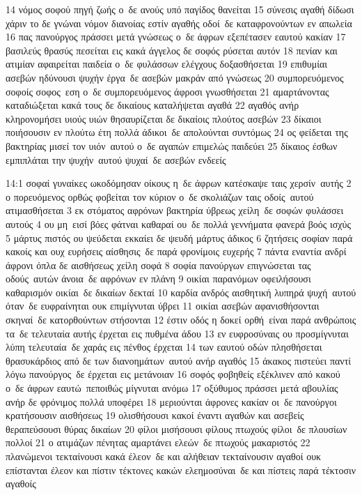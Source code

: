 \documentclass[10pt,oneside,footinclude=true,headinclude=true]{scrbook} %
\begin{document}
14 νόμος σοφού πηγή ζωής ο δε ανούς υπό παγίδος θανείται
15 σύνεσις αγαθή δίδωσι χάριν το δε γνώναι νόμον διανοίας εστίν αγαθής οδοί δε καταφρονούντων εν απωλεία
16 πας πανούργος πράσσει μετά γνώσεως ο δε άφρων εξεπέτασεν εαυτού κακίαν
17 βασιλεύς θρασύς πεσείται εις κακά άγγελος δε σοφός ρύσεται αυτόν
18 πενίαν και ατιμίαν αφαιρείται παιδεία ο δε φυλάσσων ελέγχους δοξασθήσεται
19 επιθυμίαι ασεβών ηδύνουσι ψυχήν έργα δε ασεβών μακράν από γνώσεως
20 συμπορευόμενος σοφοίς σοφος εση ο δε συμπορευόμενος άφροσι γνωσθήσεται
21 αμαρτάνοντας καταδιώξεται κακά τους δε δικαίους καταλήψεται αγαθά
22 αγαθός ανήρ κληρονομήσει υιούς υιών θησαυρίζεται δε δικαίοις πλούτος ασεβών
23 δίκαιοι ποιήσουσιν εν πλούτω έτη πολλά άδικοι δε απολούνται συντόμως
24 ος φείδεται της βακτηρίας μισεί τον υιόν αυτού ο δε αγαπών επιμελώς παιδεύει
25 δίκαιος έσθων εμπιπλάται την ψυχήν αυτού ψυχαί δε ασεβών ενδεείς
\par
14:1 σοφαί γυναίκες ωκοδόμησαν οίκους η δε άφρων κατέσκαψε ταις χερσίν αυτής
2 ο πορευόμενος ορθώς φοβείται τον κύριον ο δε σκολιάζων ταις οδοίς αυτού ατιμασθήσεται
3 εκ στόματος αφρόνων βακτηρία ύβρεως χείλη δε σοφών φυλάσσει αυτούς
4 ου μη εισί βόες φάτναι καθαραί ου δε πολλά γεννήματα φανερά βοός ισχύς
5 μάρτυς πιστός ου ψεύδεται εκκαίει δε ψευδή μάρτυς άδικος
6 ζητήσεις σοφίαν παρά κακοίς και ουχ ευρήσεις αίσθησις δε παρά φρονίμοις ευχερής
7 πάντα εναντία ανδρί άφρονι όπλα δε αισθήσεως χείλη σοφά
8 σοφία πανούργων επιγνώσεται τας οδούς αυτών άνοια δε αφρόνων εν πλάνη
9 οικίαι παρανόμων οφειλήσουσι καθαρισμόν οικίαι δε δικαίων δεκταί
10 καρδία ανδρός αισθητική λυπηρά ψυχή αυτού όταν δε ευφραίνηται ουκ επιμίγνυται ύβρει
11 οικίαι ασεβών αφανισθήσονται σκηναί δε κατορθούντων στήσονται
12 έστιν οδός η δοκεί ορθή είναι παρά ανθρώποις τα δε τελευταία αυτής έρχεται εις πυθμένα άδου
13 εν ευφροσύναις ου προσμίγνυται λύπη τελευταία δε χαράς εις πένθος έρχεται
14 των εαυτού οδών πλησθήσεται θρασυκάρδιος από δε των διανοημάτων αυτού ανήρ αγαθός
15 άκακος πιστεύει παντί λόγω πανούργος δε έρχεται εις μετάνοιαν
16 σοφός φοβηθείς εξέκλινεν από κακού ο δε άφρων εαυτώ πεποιθώς μίγνυται ανόμω
17 οξύθυμος πράσσει μετά αβουλίας ανήρ δε φρόνιμος πολλά υποφέρει
18 μεριούνται άφρονες κακίαν οι δε πανούργοι κρατήσουσιν αισθήσεως
19 ολισθήσουσι κακοί έναντι αγαθών και ασεβείς θεραπεύσουσι θύρας δικαίων
20 φίλοι μισήσουσι φίλους πτωχούς φίλοι δε πλουσίων πολλοί
21 ο ατιμάζων πένητας αμαρτάνει ελεών δε πτωχούς μακαριστός
22 πλανώμενοι τεκταίνουσι κακά έλεον δε και αλήθειαν τεκταίνουσιν αγαθοί ουκ επίστανται έλεον και πίστιν τέκτονες κακών ελεημοσύναι δε και πίστεις παρά τέκτοσιν αγαθοίς
\end{document}
